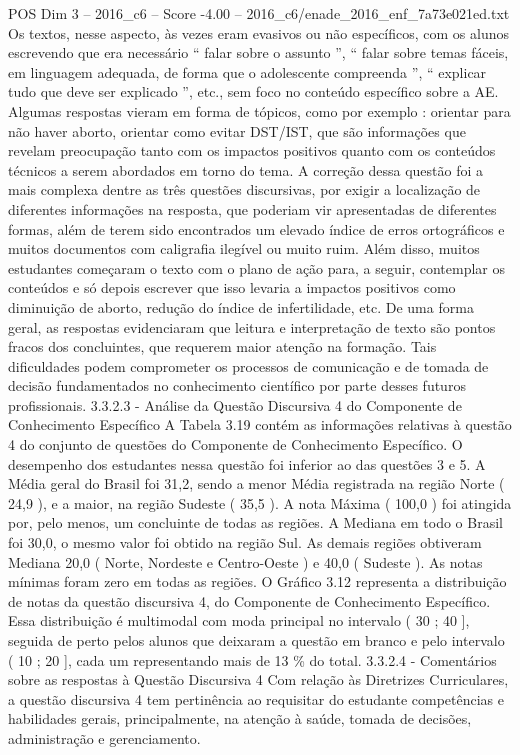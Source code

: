 \begin{textsample}{POS Dim 3 – 2016\_c6 – Score -4.00 – 2016\_c6/enade\_2016\_enf\_7a73e021ed.txt}
Os textos, nesse aspecto, às vezes eram evasivos ou não específicos, com os alunos escrevendo que era necessário “ falar sobre o assunto ”, “ falar sobre temas fáceis, em linguagem adequada, de forma que o adolescente compreenda ”, “ explicar tudo que deve ser explicado ”, etc., sem foco no conteúdo específico sobre a AE.
Algumas respostas vieram em forma de tópicos, como por exemplo : orientar para não haver aborto, orientar como evitar DST/IST, que são informações que revelam preocupação tanto com os impactos positivos quanto com os conteúdos técnicos a serem abordados em torno do tema.
A correção dessa questão foi a mais complexa dentre as três questões discursivas, por exigir a localização de diferentes informações na resposta, que poderiam vir apresentadas de diferentes formas, além de terem sido encontrados um elevado índice de erros ortográficos e muitos documentos com caligrafia ilegível ou muito ruim.
Além disso, muitos estudantes começaram o texto com o plano de ação para, a seguir, contemplar os conteúdos e só depois escrever que isso levaria a impactos positivos como diminuição de aborto, redução do índice de infertilidade, etc.
De uma forma geral, as respostas evidenciaram que leitura e interpretação de texto são pontos fracos dos concluintes, que requerem maior atenção na formação.
Tais dificuldades podem comprometer os processos de comunicação e de tomada de decisão fundamentados no conhecimento científico por parte desses futuros profissionais. 3.3.2.3 - Análise da Questão Discursiva 4 do Componente de Conhecimento Específico A Tabela 3.19 contém as informações relativas à questão 4 do conjunto de questões do Componente de Conhecimento Específico.
O desempenho dos estudantes nessa questão foi inferior ao das questões 3 e 5.
A Média geral do Brasil foi 31,2, sendo a menor Média registrada na região Norte ( 24,9 ), e a maior, na região Sudeste ( 35,5 ).
A nota Máxima ( 100,0 ) foi atingida por, pelo menos, um concluinte de todas as regiões.
A Mediana em todo o Brasil foi 30,0, o mesmo valor foi obtido na região Sul.
As demais regiões obtiveram Mediana 20,0 ( Norte, Nordeste e Centro-Oeste ) e 40,0 ( Sudeste ).
As notas mínimas foram zero em todas as regiões.
O Gráfico 3.12 representa a distribuição de notas da questão discursiva 4, do Componente de Conhecimento Específico.
Essa distribuição é multimodal com moda principal no intervalo ( 30 ; 40 ], seguida de perto pelos alunos que deixaram a questão em branco e pelo intervalo ( 10 ; 20 ], cada um representando mais de 13 \% do total. 3.3.2.4 - Comentários sobre as respostas à Questão Discursiva 4 Com relação às Diretrizes Curriculares, a questão discursiva 4 tem pertinência ao requisitar do estudante competências e habilidades gerais, principalmente, na atenção à saúde, tomada de decisões, administração e gerenciamento.

\end{textsample}
